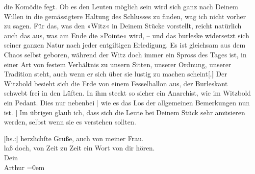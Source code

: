                die Komödie fegt. Ob es den Leuten möglich sein wird sich ganz nach Deinem {\pb}Willen in die
               gemässigtere Haltung des Schlusses zu finden, wag ich nicht vorher zu sagen. Für das,
               was den »Witz« in Deinem Stücke vorstellt, reicht natürlich auch das aus, was am Ende
               die »Pointe« wird, \introOben{}–\introOben{} und das burleske widersetzt sich seiner
               ganzen Natur nach jeder entgiltigen Erledigung. Es ist gleichsam aus dem Chaos selbst
               geboren, während der Witz doch immer ein Spross des Tages ist, in einer Art von
               festem Verhältnis zu unsern Sitten, unserer Ordnung, unserer Tradition steht, auch
               wenn er sich über sie lustig zu machen scheint{[}.{]} Der Witz\introOben{}bold\introOben{} besieht sich die Erde von einem Fesselballon aus, der
               Burleskant schwebt frei in den Lüften. In ihm steckt so sicher ein Anarchist, wie im
               Witzbold ein Pedant. Dies nur nebenbei | wie es das Los der allgemeinen Bemerkungen
               nun ist. | Im übrigen glaub ich, dass sich die Leute bei Deinem Stück sehr amüsieren
               werden, selbst wenn sie es verstehen sollten.\pend
           
\pstart
           {[}hs.:{]} herzlichſte Grüße, auch von meiner Frau.{\\[\baselineskip]}laß doch, von Zeit zu Zeit ein Wort von dir hören.{\\[\baselineskip]}Dein{\\[\baselineskip]}\spacefill\mbox{Arthur}\pend
           \leftskip=0em{}\endnumbering{}  \newcommand{\dateiname}{L01721}\newcommand{\titel}{Arthur Schnitzler an Hermann Bahr, 11. 10. 1907}\newcommand{\editorInnen}{Herausgegeben von Martin Anton Müller}
